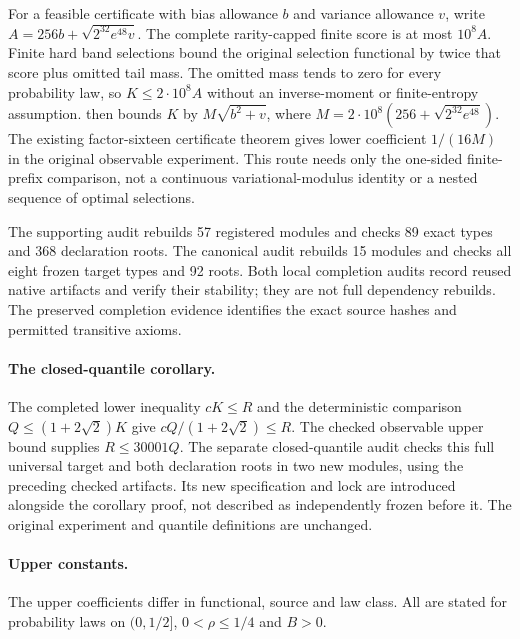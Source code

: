 For a feasible certificate with bias allowance $b$ and variance allowance $v$,
write $A=256b+\sqrt{2^{32}e^{48}v}$. The complete rarity-capped finite score is
at most $10^8 A$. Finite hard band selections bound the original selection
functional by twice that score plus omitted tail mass. The omitted mass
tends to zero for every probability law, so $K\le2\cdot10^8 A$ without an
inverse-moment or finite-entropy assumption.
then bounds $K$ by $M\sqrt{b^2+v}$, where
$M=2\cdot10^8(256+\sqrt{2^{32}e^{48}})$.
The existing factor-sixteen certificate theorem gives lower coefficient
$1/(16M)$ in the original observable experiment. This route needs only the
one-sided finite-prefix comparison, not a continuous variational-modulus
identity or a nested sequence of optimal selections.

The supporting audit rebuilds 57 registered modules and checks 89 exact
types and 368 declaration roots. The canonical audit rebuilds 15 modules
and checks all eight frozen target types and 92 roots. Both local completion
audits record reused native artifacts and verify their stability; they are
not full dependency rebuilds. The preserved completion evidence identifies
the exact source hashes and permitted transitive axioms.

\paragraph{The closed-quantile corollary.}
The completed lower inequality $cK\le R$ and the deterministic comparison
$Q\le(1+2\sqrt2)K$ give $cQ/(1+2\sqrt2)\le R$. The checked observable upper
bound supplies $R\le30001Q$. The separate closed-quantile audit checks this
full universal target and both declaration roots in two new modules, using
the preceding checked artifacts. Its new specification and lock are
introduced alongside the corollary proof, not described as independently
frozen before it. The original experiment and quantile definitions are
unchanged.

\paragraph{Upper constants.}
The upper coefficients differ in functional, source and law class. All
are stated for probability laws on $(0,1/2]$, $0<\rho\le1/4$ and $B>0$.

